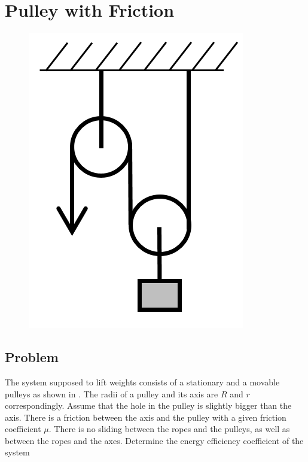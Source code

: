 \section*{Pulley with Friction}

\begin{figure}
    \centering
    \vspace{-.75cm}
    \includegraphics[width = \textwidth / 5]{P-1}
    \caption{}
    \vspace{-1cm}
\end{figure}
\subsection*{Problem}

The system supposed to lift weights
consists of a stationary and a movable pulleys
as shown in .
The radii of a pulley and its axis are $R$ and $r$ correspondingly.
Assume that the hole in the pulley is slightly bigger than the axis.
There is a friction between the axis and the pulley
with a given friction coefficient $\mu$.
There is no sliding between the ropes and the pulleys,
as well as between the ropes and the axes.
Determine the energy efficiency coefficient of the system

